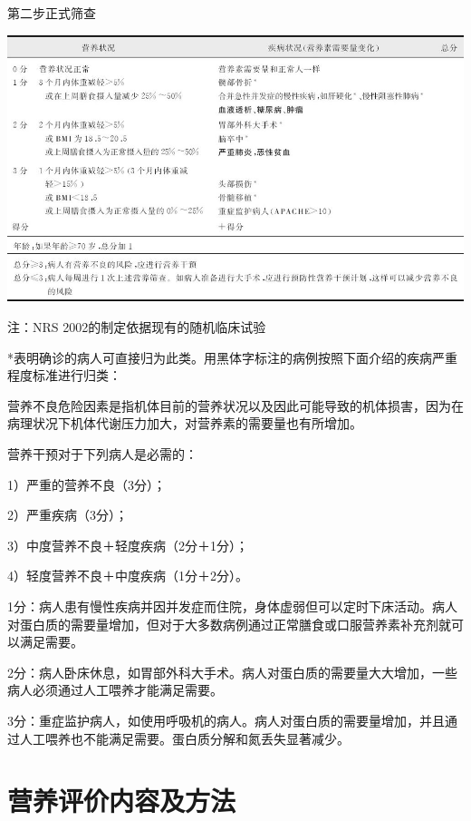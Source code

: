 \begin{table}[htbp]
{\centering
\caption{第二步正式筛查}
\label{tab1-2}
\includegraphics{./images/Image00001.jpg}}

{注：NRS 2002的制定依据现有的随机临床试验}

{*表明确诊的病人可直接归为此类。用黑体字标注的病例按照下面介绍的疾病严重程度标准进行归类：}

{营养不良危险因素是指机体目前的营养状况以及因此可能导致的机体损害，因为在病理状况下机体代谢压力加大，对营养素的需要量也有所增加。}

{营养干预对于下列病人是必需的：}

{1）严重的营养不良（3分）；}

{2）严重疾病（3分）；}

{3）中度营养不良＋轻度疾病（2分＋1分）；}

{4）轻度营养不良＋中度疾病（1分＋2分）。}

{1分：病人患有慢性疾病并因并发症而住院，身体虚弱但可以定时下床活动。病人对蛋白质的需要量增加，但对于大多数病例通过正常膳食或口服营养素补充剂就可以满足需要。}

{2分：病人卧床休息，如胃部外科大手术。病人对蛋白质的需要量大大增加，一些病人必须通过人工喂养才能满足需要。}

{3分：重症监护病人，如使用呼吸机的病人。病人对蛋白质的需要量增加，并且通过人工喂养也不能满足需要。蛋白质分解和氮丢失显著减少。}
\end{table}



\hypertarget{text00002.htmlux5cux23mllj4}{%
\section{营养评价内容及方法}\label{text00002.htmlux5cux23mllj4}}

